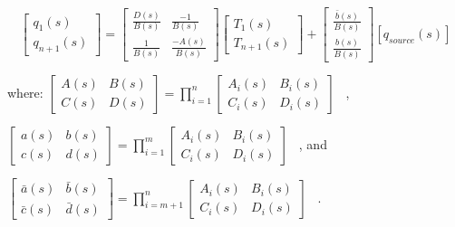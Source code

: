\begin{equation}
\left[ {\begin{array}{*{20}{c}}{{q_1}\left( s \right)}\\ {{q_{n + 1}}\left( s \right)}\end{array}} \right] = \left[ {\begin{array}{*{20}{c}}{\frac{{D\left( s \right)}}{{B\left( s \right)}}}&{\frac{{ - 1}}{{B\left( s \right)}}}\\ {\frac{1}{{B\left( s \right)}}}&{\frac{{ - A\left( s \right)}}{{B\left( s \right)}}}\end{array}} \right]\left[ {\begin{array}{*{20}{c}}{{T_1}\left( s \right)}\\ {{T_{n + 1}}\left( s \right)}\end{array}} \right] + \left[ {\begin{array}{*{20}{c}}{\frac{{\bar b\left( s \right)}}{{B\left( s \right)}}}\\ {\frac{{b\left( s \right)}}{{B\left( s \right)}}}\end{array}} \right]\left[ {{q_{source}}\left( s \right)} \right]
\end{equation}

where: \(\left[ {\begin{array}{*{20}{c}}{A\left( s \right)}&{B\left( s \right)}\\ {C\left( s \right)}&{D\left( s \right)}\end{array}} \right] = \prod\limits_{i = 1}^n {\left[ {\begin{array}{*{20}{c}}{{A_i}\left( s \right)}&{{B_i}\left( s \right)}\\ {{C_i}\left( s \right)}&{{D_i}\left( s \right)}\end{array}} \right]}\) ~,

\(\left[ {\begin{array}{*{20}{c}}{a\left( s \right)}&{b\left( s \right)}\\ {c\left( s \right)}&{d\left( s \right)}\end{array}} \right] = \prod\limits_{i = 1}^m {\left[ {\begin{array}{*{20}{c}}{{A_i}\left( s \right)}&{{B_i}\left( s \right)}\\ {{C_i}\left( s \right)}&{{D_i}\left( s \right)}\end{array}} \right]}\) ~, and

\(\left[ {\begin{array}{*{20}{c}}{\bar a\left( s \right)}&{\bar b\left( s \right)}\\ {\bar c\left( s \right)}&{\bar d\left( s \right)}\end{array}} \right] = \prod\limits_{i = m + 1}^n {\left[ {\begin{array}{*{20}{c}}{{A_i}\left( s \right)}&{{B_i}\left( s \right)}\\ {{C_i}\left( s \right)}&{{D_i}\left( s \right)}\end{array}} \right]}\) ~.

